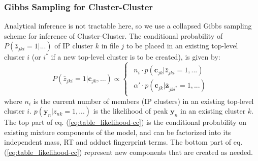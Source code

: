 \subsubsection{Gibbs Sampling for Cluster-Cluster\label{sub:cluster-cluster-gibbs}}

Analytical inference is not tractable here, so we use a collapsed Gibbs sampling scheme for inference of Cluster-Cluster. The conditional probability of $P(\bar{z}_{jki}=1\vert...)$ of IP cluster $k$ in file $j$ to be placed in an existing top-level cluster $i$ (or $i^{*}$ if a new top-level cluster is to be created), is given by:
\begin{equation}
P(\bar{z}_{jki}=1|\boldsymbol{c}_{jk},\ldots)\propto\begin{cases}
\begin{array}{c}
n_{i}\cdot p(\boldsymbol{c}_{jk}|\bar{z}_{jki}=1,...)\\
\alpha'\cdot p(\boldsymbol{c}_{jk}|\boldsymbol{\bar{z}}_{jki^{*}}=1,...)
\end{array}\end{cases}\label{eq:table_likelihood-cc}
\end{equation}
where $n_{i}$ is the current number of members (IP clusters) in an existing top-level cluster $i$. $p(\mathbf{y}_{n}|z_{nk}=1,...)$ is the likelihood of peak $\mathbf{y}_{n}$ in an existing cluster $k$. The top part of eq. (\ref{eq:table_likelihood-cc}) is the conditional probability on existing mixture components of the model, and can be factorized into its independent mass, RT and adduct fingerprint terms. The bottom part of eq. (\ref{eq:table_likelihood-cc}) represent new components that are created as needed. 
